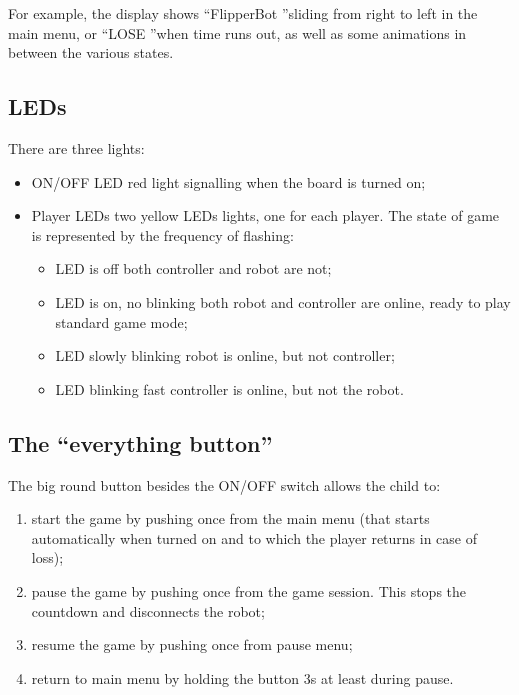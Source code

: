 \documentclass[a4paper,twoside]{book}
\begin{document}
For example, the display shows \textquotedblleft FlipperBot \textquotedblright sliding from right to left in the main menu, or \textquotedblleft LOSE \textquotedblright when time runs out, as well as some animations in between the various states.


\subsection{LEDs}

There are three lights:
\begin{itemize}
\item ON/OFF LED \textemdash red light signalling when the board is turned on;
\item Player LEDs \textemdash two yellow LEDs lights, one for each player. The state of game is represented by the frequency of flashing:
	\begin{itemize}
	\item LED is off \textemdash both controller and robot are not;
	\item LED is on, no blinking \textemdash both robot and controller are online, ready to play standard game mode;
	\item LED slowly blinking \textemdash robot is online, but not controller;
	\item LED blinking fast \textemdash controller is online, but not the robot.
	\end{itemize}
\end{itemize}

\subsection{The \textquotedblleft everything button\textquotedblright}

The big round button besides the ON/OFF switch allows the child to:
\begin{enumerate}
\item start the game \textemdash by pushing once from the main menu (that starts automatically when turned on and to which the player returns in case of loss);
\item pause the game \textemdash by pushing once from the game session. This stops the countdown and disconnects the robot;
\item resume the game \textemdash by pushing once from pause menu;
\item return to main menu \textemdash by holding the button 3s at least during pause.
\end{enumerate}
\end{document}
